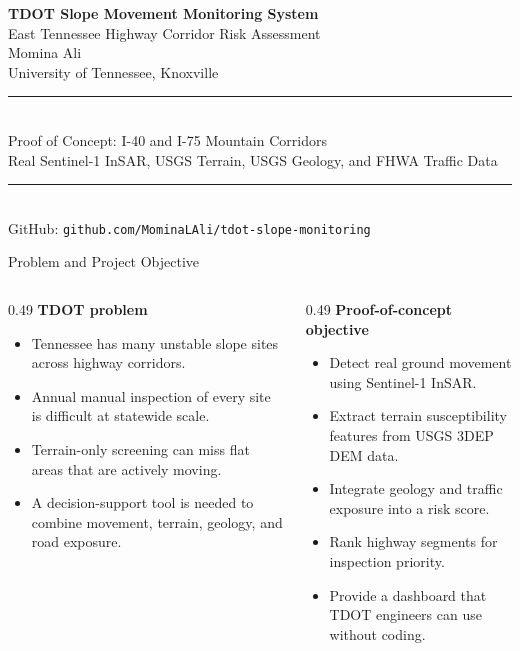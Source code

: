 \documentclass[aspectratio=169,11pt]{beamer}
\newcommand{\slideheading}[1]{\vspace{0.05cm}\textbf{#1}\vspace{0.12cm}}
\begin{document}
\begin{frame}[plain]
\centering
\vspace{0.8cm}
{\Large\bfseries TDOT Slope Movement Monitoring System}\\[0.25cm]
{\normalsize East Tennessee Highway Corridor Risk Assessment}\\[0.8cm]
{\normalsize Momina Ali}\\[0.1cm]
{\small University of Tennessee, Knoxville}\\[0.9cm]
\rule{0.78\textwidth}{0.4pt}\\[0.25cm]
{\small Proof of Concept: I-40 and I-75 Mountain Corridors}\\[0.15cm]
{\small Real Sentinel-1 InSAR, USGS Terrain, USGS Geology, and FHWA Traffic Data}\\[0.25cm]
\rule{0.78\textwidth}{0.4pt}\\[0.55cm]
{\scriptsize GitHub: \texttt{github.com/MominaLAli/tdot-slope-monitoring}}
\end{frame}

\begin{frame}{Problem and Project Objective}
\begin{columns}[T,onlytextwidth]
\begin{column}{0.49\textwidth}
\slideheading{TDOT problem}
\begin{itemize}\setlength\itemsep{0.25em}
  \item Tennessee has many unstable slope sites across highway corridors.
  \item Annual manual inspection of every site is difficult at statewide scale.
  \item Terrain-only screening can miss flat areas that are actively moving.
  \item A decision-support tool is needed to combine movement, terrain, geology, and road exposure.
\end{itemize}
\end{column}
\begin{column}{0.49\textwidth}
\slideheading{Proof-of-concept objective}
\begin{itemize}\setlength\itemsep{0.25em}
  \item Detect real ground movement using Sentinel-1 InSAR.
  \item Extract terrain susceptibility features from USGS 3DEP DEM data.
  \item Integrate geology and traffic exposure into a risk score.
  \item Rank highway segments for inspection priority.
  \item Provide a dashboard that TDOT engineers can use without coding.
\end{itemize}
\end{column}
\end{columns}
\vspace{0.22cm}
\begin{center}
\end{center}
\end{frame}
\end{document}
